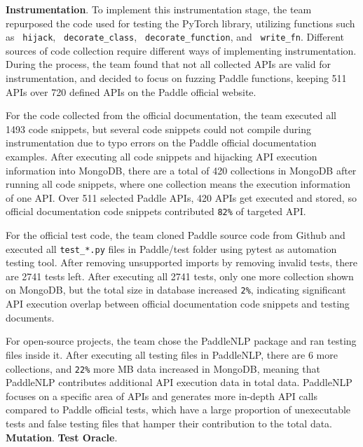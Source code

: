 \documentclass[sigconf]{acmart}
\begin{document}
  \textbf{Instrumentation}. To implement this instrumentation stage, the team repurposed the code used for testing the PyTorch library, 
  utilizing functions such as \verb| hijack|, \verb| decorate_class|, \verb| decorate_function|, and \verb| write_fn|. Different sources of code collection require different ways of implementing instrumentation. 
  During the process, the team found that not all collected APIs are valid for instrumentation, and decided to focus on fuzzing Paddle functions, keeping 511 APIs over 720 defined APIs on the Paddle official website.
  
  \par For the code collected from the official documentation, the team executed all 1493 code snippets, but several code snippets could not compile during instrumentation due to typo errors on the Paddle official documentation examples. 
  After executing all code snippets and hijacking API execution information into MongoDB, there are a total of 420 collections in MongoDB after running all code snippets, 
  where one collection means the execution information of one API. Over 511 selected Paddle APIs, 420 APIs get executed and stored, so official documentation code snippets contributed \verb|82%| of targeted API.

  \par For the official test code, the team cloned Paddle source code from Github and executed all \verb|test_*.py| files in Paddle/test folder using pytest as automation testing tool. 
  After removing unsupported imports by removing invalid tests, there are 2741 tests left. After executing all 2741 tests, only one more collection shown on MongoDB, but the total size in database increased  \verb|2%|, 
  indicating significant API execution overlap between official documentation code snippets and testing documents.

  \par For open-source projects, the team chose the PaddleNLP package and ran testing files inside it. After executing all testing files in PaddleNLP, there are 6 more collections, and \verb|22%| more MB data increased in MongoDB, 
  meaning that PaddleNLP contributes additional API execution data in total data. PaddleNLP focuses on a specific area of APIs and generates more in-depth API calls compared to Paddle official tests, 
  which have a large proportion of unexecutable tests and false testing files that hamper their contribution to the total data.
  \newline \textbf{Mutation}.
  \newline \textbf{Test Oracle}.
  
\end{document}
